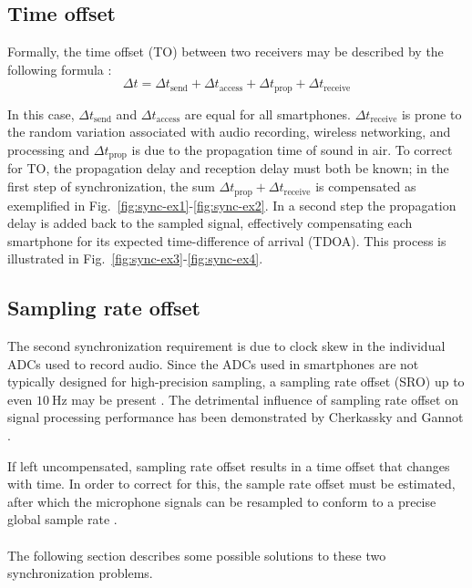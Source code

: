 \documentclass[a4paper, notitlepage]{report}
\begin{document}
\subsection{Time offset}
Formally, the time offset (TO) between two receivers may be described by the following formula \cite{Lasassmeh2010}:
\begin{equation}
\Delta t = \Delta t_{\text{send}} + \Delta t_{\text{access}} +  \Delta t_{\text{prop}} + \Delta t_{\text{receive}}
\end{equation}

In this case, $\Delta t_{\text{send}}$ and $\Delta t_{\text{access}}$ are equal for all smartphones. $\Delta t_{\text{receive}}$ is prone to the random variation associated with audio recording, wireless networking, and processing and $\Delta t_{\text{prop}}$ is due to the propagation time of sound in air.
To correct for TO, the propagation delay and reception delay must both be known; in the first step of synchronization, the sum $\Delta t_{\text{prop}}+\Delta t_{\text{receive}}$ is compensated as exemplified in Fig.~\ref{fig:sync-ex1}-\ref{fig:sync-ex2}. In a second step the propagation delay is added back to the sampled signal, effectively compensating each smartphone for its expected time-difference of arrival (TDOA). This process is illustrated in Fig.~\ref{fig:sync-ex3}-\ref{fig:sync-ex4}.

\subsection{Sampling rate offset}
\label{sec:problem-sro}
The second synchronization requirement is due to clock skew in the individual ADCs used to record audio. Since the ADCs used in smartphones are not typically designed for high-precision sampling, a sampling rate offset (SRO) up to even $10~\mathrm{Hz}$ may be present \cite{pawig2010}. The detrimental influence of sampling rate offset on signal processing performance has been demonstrated by Cherkassky and Gannot \cite{cherkassky2014}.

If left uncompensated, sampling rate offset results in a time offset that changes with time. In order to correct for this, the sample rate offset must be estimated, after which the microphone signals can be resampled to conform to a precise global sample rate \cite{golan2012}.

\paragraph*{}
The following section describes some possible solutions to these two synchronization problems.
\end{document}
